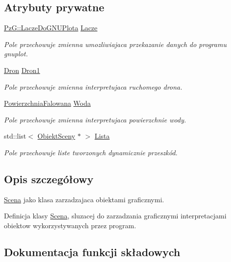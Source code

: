 \subsection*{Atrybuty prywatne}
\begin{DoxyCompactItemize}
\item 
\hyperlink{classPzG_1_1LaczeDoGNUPlota}{Pz\+G\+::\+Lacze\+Do\+G\+N\+U\+Plota} \hyperlink{classScena_ae8d7d121ba09af12c456a6dfe6da316b}{Lacze}
\begin{DoxyCompactList}\small\item\em Pole przechowuje zmienna umozliwiajaca przekazanie danych do programu {\itshape gnuplot}. \end{DoxyCompactList}\item 
\hyperlink{classDron}{Dron} \hyperlink{classScena_a98ad54358eeb2b6f1ea3c4b1c16c72b4}{Dron1}
\begin{DoxyCompactList}\small\item\em Pole przechowuje zmienna interpretujaca ruchomego drona. \end{DoxyCompactList}\item 
\hyperlink{classPowierzchniaFalowana}{Powierzchnia\+Falowana} \hyperlink{classScena_a6053a6a241f17e12f47717a73d0988d6}{Woda}
\begin{DoxyCompactList}\small\item\em Pole przechowuje zmienna interpretujaca powierzchnie wody. \end{DoxyCompactList}\item 
std\+::list$<$ \hyperlink{classObiektSceny}{Obiekt\+Sceny} $\ast$ $>$ \hyperlink{classScena_ad892638f354c23efb22296381aedd04f}{Lista}
\begin{DoxyCompactList}\small\item\em Pole przechowuje liste tworzonych dynamicznie przeszkód. \end{DoxyCompactList}\end{DoxyCompactItemize}


\subsection{Opis szczegółowy}
\hyperlink{classScena}{Scena} jako klasa zarzadzajaca obiektami graficznymi. 

Definicja klasy \hyperlink{classScena}{Scena}, sluzacej do zarzadzania graficznymi interpretacjami obiektow wykorzystywanych przez program. 

\subsection{Dokumentacja funkcji składowych}
\mbox{\label{classScena_acb95c285091570758e28c06dfa4f6d66}} 
